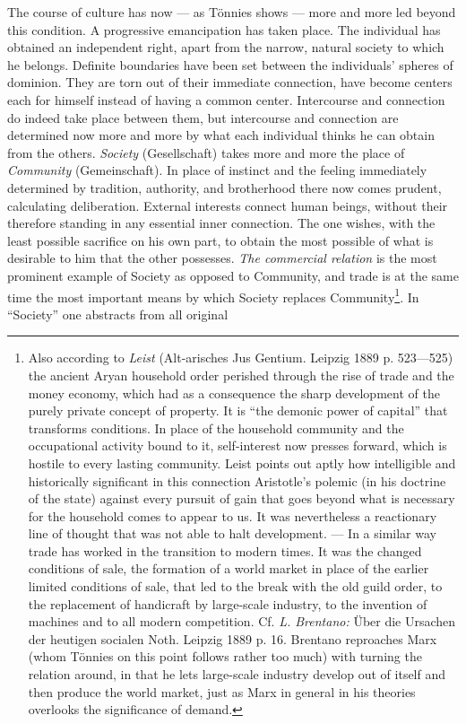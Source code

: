 \documentclass[12pt,a4paper,openany]{book}
\newcommand{\opage}[1]{\marginnote{\footnotesize\textit{[#1]}}}
\begin{document}
The course of culture has now --- as Tönnies shows --- more
and more led beyond this condition. A progressive
emancipation has taken place. The individual has obtained an
independent right, apart from the narrow, natural society to which he
belongs. Definite boundaries have been set between the
individuals' spheres of dominion. They are torn out of their immediate
connection, have become centers each for himself instead of having
\opage{146}a common center. Intercourse and connection do indeed take place
between them, but intercourse and connection are determined
now more and more by what each individual thinks he can
obtain from the others. \emph{Society} (Gesellschaft) takes more and more
the place of \emph{Community} (Gemeinschaft). In place of
instinct and the feeling immediately determined by tradition, authority, and brotherhood
there now comes prudent,
calculating deliberation. External interests connect human beings,
without their therefore standing in any essential inner connection.
The one wishes, with the least possible sacrifice on his own part, to obtain
the most possible of what is desirable to him that the other
possesses. \emph{The commercial relation} is the most prominent example
of Society as opposed to Community, and trade
is at the same time the most important means by which Society replaces
Community\footnote{Also according to \emph{Leist} (Alt-arisches Jus Gentium. Leipzig 1889 p.
523---525) the ancient Aryan household order perished through
the rise of trade and the money economy, which had as a consequence the sharp
development of the purely private concept of property. It is ``the
demonic power of capital'' that transforms conditions. In place of
the household community and the occupational activity bound to it,
self-interest now presses forward, which is hostile to every lasting
community. Leist points out aptly how intelligible
and historically significant in this connection Aristotle's
polemic (in his doctrine of the state) against every pursuit of gain that goes
beyond what is necessary for the household comes to appear
to us. It was nevertheless a reactionary line of thought that was not able to
halt development. --- In a similar way trade has worked
in the transition to modern times. It was the changed
conditions of sale, the formation of a world market in place of the earlier
limited conditions of sale, that led to the break with the old
guild order, to the replacement of handicraft by large-scale industry, to
the invention of machines and to all modern competition. Cf.
\emph{L. Brentano:} Über die Ursachen der heutigen socialen Noth. Leipzig
1889 p. 16. Brentano reproaches Marx (whom Tönnies on this
point follows rather too much) with turning the relation around, in that he
lets large-scale industry develop out of itself and then
produce the world market, just as Marx in general in his theories
overlooks the significance of demand.}. In ``Society'' one abstracts from all original
\end{document}
